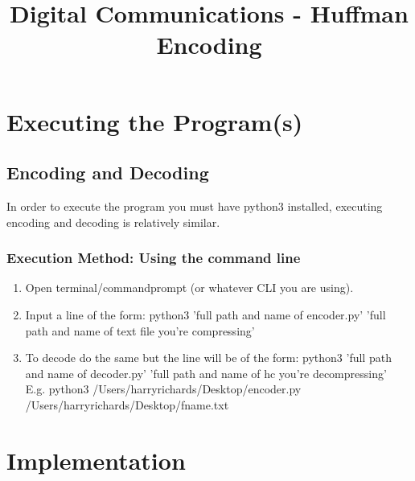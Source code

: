 \documentclass{mm2}
\title{Digital Communications - Huffman Encoding}
\begin{document}
\section{Executing the Program(s)}
\subsection{Encoding and Decoding}
In order to execute the program you must have python3 installed, executing encoding and decoding is relatively similar.

\subsubsection{Execution Method: Using the command line}
\begin{enumerate}
\item Open terminal/commandprompt (or whatever CLI you are using).
\item Input a line of the form: python3 'full path and name of encoder.py' 'full path and name of text file you're compressing'
\item To decode do the same but the line will be of the form: python3 'full path and name of decoder.py' 'full path and name of hc you're decompressing'\\
E.g. python3 /Users/harryrichards/Desktop/encoder.py /Users/harryrichards/Desktop/fname.txt
\end{enumerate}

\section{Implementation}
\end{document}
